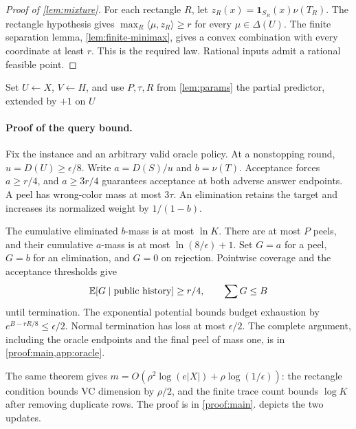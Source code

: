 \begin{proof}[Proof of \cref{lem:mixture}]
For each rectangle $R$, let $z_R(x)=\mathbf1_{S_R}(x)\nu(T_R)$. The rectangle hypothesis gives $\max_R\langle\mu,z_R\rangle\ge r$ for every $\mu\in\Delta(U)$. The finite separation lemma, \cref{lem:finite-minimax}, gives a convex combination with every coordinate at least $r$. This is the required law. Rational inputs admit a rational feasible point.
\end{proof}
\begin{algorithm}[t]
\caption{RECTIFY: rectangle peeling and elimination}\label{alg:rectify}
Set $U\gets X$, $V\gets H$, and use $P,\tau,R$ from \cref{lem:params}\;
\Return the partial predictor, extended by $+1$ on $U$\;
\end{algorithm}

\paragraph{Proof of the query bound.}
Fix the instance and an arbitrary valid oracle policy. At a nonstopping round, $u=D(U)\ge\epsilon/8$. Write $a=D(S)/u$ and $b=\nu(T)$. Acceptance forces $a\ge r/4$, and $a\ge3r/4$ guarantees acceptance at both adverse answer endpoints. A peel has wrong-color mass at most $3\tau$. An elimination retains the target and increases its normalized weight by $1/(1-b)$.

The cumulative eliminated $b$-mass is at most $\ln K$. There are at most $P$ peels, and their cumulative $a$-mass is at most $\ln(8/\epsilon)+1$. Set $G=a$ for a peel, $G=b$ for an elimination, and $G=0$ on rejection. Pointwise coverage and the acceptance thresholds give
\[
 \mathbb E[G\mid\text{public history}]\ge r/4,\qquad
 \sum G\le B
\]
until termination. The exponential potential bounds budget exhaustion by $e^{B-rR/8}\le\epsilon/2$. Normal termination has loss at most $\epsilon/2$. The complete argument, including the oracle endpoints and the final peel of mass one, is in \cref{proof:main,app:oracle}.

The same theorem gives $m=O(\rho^2\log(e|X|)+\rho\log(1/\epsilon))$: the rectangle condition bounds VC dimension by $\rho/2$, and the finite trace count bounds $\log K$ after removing duplicate rows. The proof is in \cref{proof:main}.  depicts the two updates.
